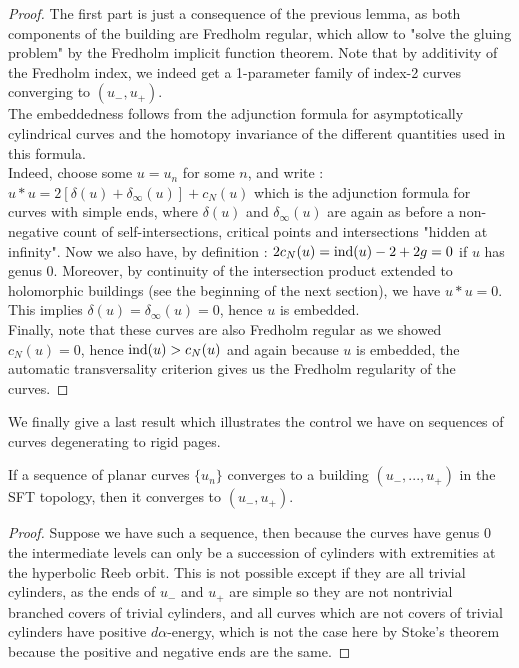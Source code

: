 \documentclass[../main.tex]{subfiles}
\begin{document}
\begin{proof}
The first part is just a consequence of the previous lemma, as both components of the building are Fredholm regular, which allow to "solve the gluing problem" by the Fredholm implicit function theorem. Note that by additivity of the Fredholm index, we indeed get a 1-parameter family of index-2 curves converging to $(u_-,u_+)$. \\

The embeddedness follows from the adjunction formula for asymptotically cylindrical curves and the homotopy invariance of the different quantities used in this formula. \\
Indeed, choose some $u = u_n$ for some $n$, and write : $u*u = 2[\delta(u) + \delta_\infty(u)] + c_N(u) $ which is the adjunction formula for curves with simple ends, where $\delta(u)$ and $\delta_\infty(u)$ are again as before a non-negative count of self-intersections, critical points and intersections "hidden at infinity". Now we also have, by definition : $2c_N(u) = \text{ind}(u) -2 + 2g  = 0$ if $u$ has genus $0$. Moreover, by continuity of the intersection product extended to holomorphic buildings (see the beginning of the next section), we have $u*u = 0$. This implies $\delta(u) = \delta_\infty(u) = 0$, hence $u$ is embedded.
\\

Finally, note that these curves are also Fredholm regular as we showed $c_N(u) =0$, hence $\text{ind}(u) > c_N(u)$ and again because $u$ is embedded, the automatic transversality criterion\cite{wendl_automatic_2009} gives us the Fredholm regularity of the curves.
\end{proof}

We finally give a last result which illustrates the control we have on sequences of curves degenerating to rigid pages.

\begin{lemma}
If a sequence of planar curves $\{u_n\}$ converges to a building $(u_-,...,u_+)$ in the SFT topology, then it converges to $(u_-,u_+)$.
\end{lemma}

\begin{proof}
Suppose we have such a sequence, then because the curves have genus $0$ the intermediate levels can only be a succession of cylinders with extremities at the hyperbolic Reeb orbit. This is not possible except if they are all trivial cylinders, as the ends of $u_-$ and $u_+ $ are simple so they are not nontrivial branched covers of trivial cylinders, and all curves which are not covers of trivial cylinders have positive $d\alpha$-energy, which is not the case here by Stoke's theorem because the positive and negative ends are the same.
\end{proof}
\end{document}
